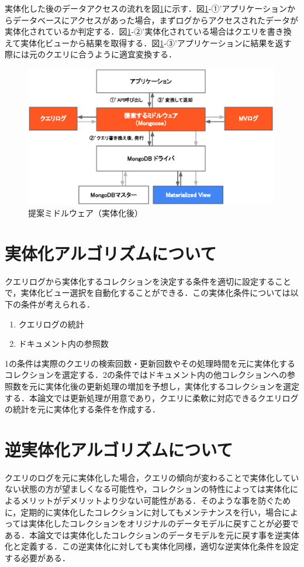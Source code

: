 \documentclass[a4paper,11pt]{ujreport}
\begin{document}
実体化した後のデータアクセスの流れを図\ref{MidlewareMv}に示す．図\ref{MidlewareMv}-①’アプリケーションからデータベースにアクセスがあった場合，まずログからアクセスされたデータが実体化されているか判定する．図\ref{MidlewareMv}-②’実体化されている場合はクエリを書き換えて実体化ビューから結果を取得する．図\ref{MidlewareMv}-③’アプリケーションに結果を返す際には元のクエリに合うように適宜変換する．
\begin{figure}[htbp]
	\begin{center}
		\includegraphics[width=30em]{src/MidlewareMv.eps} %
	\end{center}
	\caption{提案ミドルウェア（実体化後）}
	\label{MidlewareMv}
\end{figure}

\section{実体化アルゴリズムについて}
クエリログから実体化するコレクションを決定する条件を適切に設定することで，実体化ビュー選択を自動化することができる．この実体化条件については以下の条件が考えられる．
\begin{enumerate}
  \item クエリログの統計
  \item ドキュメント内の参照数
\end{enumerate}
1の条件は実際のクエリの検索回数・更新回数やその処理時間を元に実体化するコレクションを選定する．2の条件ではドキュメント内の他コレクションへの参照数を元に実体化後の更新処理の増加を予想し，実体化するコレクションを選定する．本論文では更新処理が用意であり，クエリに柔軟に対応できるクエリログの統計を元に実体化する条件を作成する．

\section{逆実体化アルゴリズムについて}
クエリのログを元に実体化した場合，クエリの傾向が変わることで実体化していない状態の方が望ましくなる可能性や，コレクションの特性によっては実体化によるメリットがデメリットより少ない可能性がある．そのような事を防ぐために，定期的に実体化したコレクションに対してもメンテナンスを行い，場合によっては実体化したコレクションをオリジナルのデータモデルに戻すことが必要である．本論文では実体化したコレクションのデータモデルを元に戻す事を逆実体化と定義する．この逆実体化に対しても実体化同様，適切な逆実体化条件を設定する必要がある．
\end{document}
